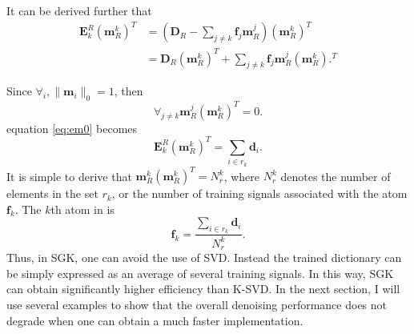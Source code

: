 It can be derived further that
\begin{equation}
\label{eq:em0}
\begin{split}
\mathbf{E}^R_k (\mathbf{m}_R^k)^T &= \left(\mathbf{D}_R-\sum_{j\ne k}\mathbf{f}_j\mathbf{m}_R^j\right) (\mathbf{m}_R^k )^T \\
&= \mathbf{D}_R (\mathbf{m}_R^k )^T  + \sum_{j\ne k}\mathbf{f}_j\mathbf{m}_R^j (\mathbf{m}_R^k ).^T
\end{split}
\end{equation}

Since $\forall_i,\parallel \mathbf{m}_i \parallel_0=1$,  then 
\begin{equation}
\label{eq:ortho}
\forall_{j\ne k} \mathbf{m}_R^j (\mathbf{m}_R^k )^T =  0.
\end{equation}
 equation \ref{eq:em0} becomes
\begin{equation}
\label{eq:em}
\mathbf{E}^R_k (\mathbf{m}_R^k)^T = \sum_{i\in r_k}\mathbf{d}_i.
\end{equation}
It is simple to derive that $\mathbf{m}_R^k(\mathbf{m}_R^k)^T=N_r^k$, %
 where $N_r^k$ denotes the number of elements in the set $r_k$, or the number of training signals associated with the atom $\mathbf{f}_k$. The $k$th atom in  is
\begin{equation}
\label{eq:fk}
\mathbf{f}_k =\frac{\sum_{i\in r_k}\mathbf{d}_i}{N_r^k}.
\end{equation}
Thus, in SGK, one can avoid the use of SVD. Instead the trained dictionary can be simply expressed as an average of several training signals. In this way, SGK can obtain significantly higher efficiency than K-SVD. In the next section, I will use several examples to show that the overall denoising performance does not degrade when one can obtain a much faster implementation.

